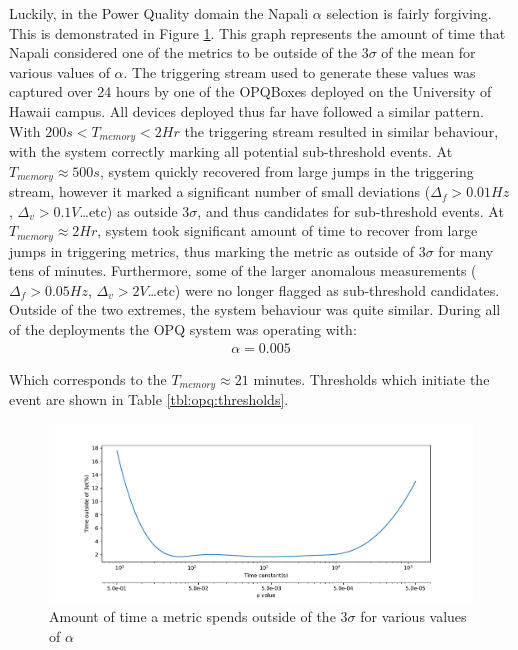 Luckily, in the Power Quality domain the Napali $\alpha$ selection is fairly forgiving.
This is demonstrated in Figure \ref{fig:expdes:6}.
This graph represents the amount of time that Napali considered one of the metrics to be outside of the $3\sigma$ of the mean for various values of $\alpha$.
The triggering stream used to generate these values was captured over 24 hours by one of the OPQBoxes deployed on the University of Hawaii campus.
All devices deployed thus far have followed a similar pattern.
With $200s <T_{memory} < 2Hr$ the triggering stream resulted in similar behaviour, with the system correctly marking all potential sub-threshold events.
At $T_{memory} \approx 500s$, system quickly recovered from large jumps in the triggering stream, however it marked a significant number of small deviations ($\Delta_{f}>0.01Hz$, $\Delta_{v}> 0.1V$\ldots etc) as outside $3\sigma$, and thus candidates for sub-threshold events.
At $T_{memory} \approx 2Hr$, system took  significant amount of time to recover from large jumps in triggering metrics, thus marking the metric as outside of $3\sigma$ for many tens of minutes.
Furthermore, some of the larger anomalous measurements ($\Delta_{f}>0.05Hz$, $\Delta_{v}> 2V$\ldots etc) were no longer flagged as sub-threshold candidates.
Outside of the two extremes, the system behaviour was quite similar.
During all of the deployments the OPQ system was operating with:
\begin{equation}\label{eq:opq_alpha}
\begin{aligned}
    \alpha = 0.005
\end{aligned}
\end{equation}


Which corresponds to the $T_{memory} \approx 21$ minutes.
Thresholds which initiate the event are shown in Table \ref{tbl:opq:thresholds}.

\begin{figure}[h]
    \centering
        \includegraphics[width=1\linewidth]{img/napali_eval/a_selection.pdf}
    \caption{Amount of time a metric spends outside of the $3\sigma$ for various values of $\alpha$}
    \label{fig:expdes:6}
\end{figure}


